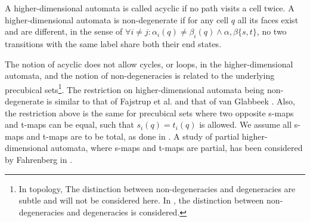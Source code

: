    \begin{definition}
        \label{def:acyclic-and-non-degenerate-higher-dimensional-automata}
        A higher-dimensional automata is called acyclic if no path visits a cell twice. A higher-dimensional automata is non-degenerate if for any cell $q$ all its faces exist and are different, in the sense of $\forall i \neq j : \alpha_i(q) \neq \beta_i(q) \wedge \alpha , \beta \{s,t\}$, no two transitions with the same label share both their end states.
    \end{definition}
    
    The notion of acyclic does not allow cycles, or loops, in the higher-dimensional automata, and the notion of non-degeneracies is related to the underlying precubical sets\footnote{In topology, The distinction between non-degeneracies and degeneracies are subtle and will not be considered here. In \cite{Goubault95PhDThesis}, the  distinction between non-degeneracies and degeneracies is considered.}. The restriction on higher-dimensional automata being non-degenerate is similar to that of Fajstrup et al. \cite{Fajstrup16DirectedAlgebraicTopologyConcurrency} and that of van Glabbeek \cite{Glabbeek06HDA}. Also, the restriction above is the same for precubical sets where two opposite s-maps and t-maps can be equal, such that $s_i(q) = t_i(q)$ is allowed. We assume all s-maps and t-maps are to be total, as done in \cite{Johansen16STstruct}. A study of partial higher-dimensional automata, where s-maps and t-maps are partial, has been considered by Fahrenberg in \cite{Fahrenberg15PartialHDA}.
    
    
    
    

    
